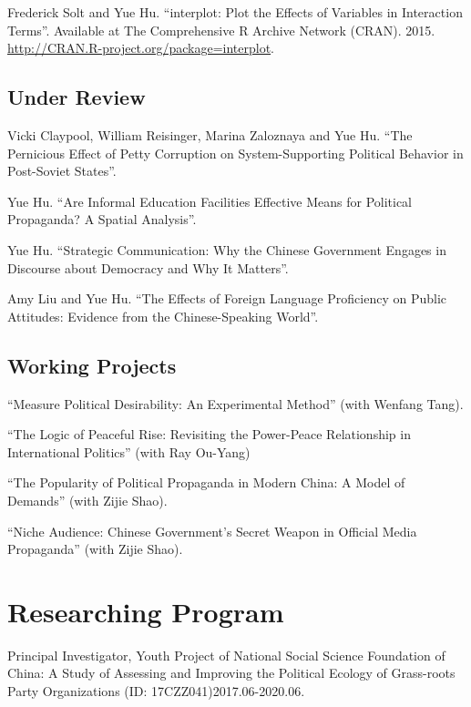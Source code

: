 \documentclass[10.5pt,]{article}
\providecommand{\tightlist}{%
	\setlength{\itemsep}{0pt}\setlength{\parskip}{0pt}}
\renewenvironment{itemize}{
	\begin{list}{}{
			\setlength{\leftmargin}{1.5em}
		}
	}{
	\end{list}
}
\begin{document}
Frederick Solt and Yue Hu. ``interplot: Plot the Effects of Variables in
Interaction Terms''. Available at The Comprehensive R Archive Network
(CRAN). 2015. \url{http://CRAN.R-project.org/package=interplot}.

\subsection{Under Review}\label{under-review}

Vicki Claypool, William Reisinger, Marina Zaloznaya and Yue Hu. ``The
Pernicious Effect of Petty Corruption on System-Supporting Political
Behavior in Post-Soviet States''.

Yue Hu. ``Are Informal Education Facilities Effective Means for
Political Propaganda? A Spatial Analysis''.

Yue Hu. ``Strategic Communication: Why the Chinese Government Engages in
Discourse about Democracy and Why It Matters''.

Amy Liu and Yue Hu. ``The Effects of Foreign Language Proficiency on
Public Attitudes: Evidence from the Chinese-Speaking World''.

\subsection{Working Projects}\label{working-projects}

``Measure Political Desirability: An Experimental Method'' (with Wenfang
Tang).

``The Logic of Peaceful Rise: Revisiting the Power-Peace Relationship in
International Politics'' (with Ray Ou-Yang)

``The Popularity of Political Propaganda in Modern China: A Model of
Demands'' (with Zijie Shao).

``Niche Audience: Chinese Government's Secret Weapon in Official Media
Propaganda'' (with Zijie Shao).

\section{Researching Program}\label{researching-program}

\begin{itemize}
\tightlist
\item
  Principal Investigator, Youth Project of National Social Science
  Foundation of China: A Study of Assessing and Improving the Political
  Ecology of Grass-roots Party Organizations (ID:
  17CZZ041)\hfill 2017.06-2020.06.
\end{itemize}
\end{document}
